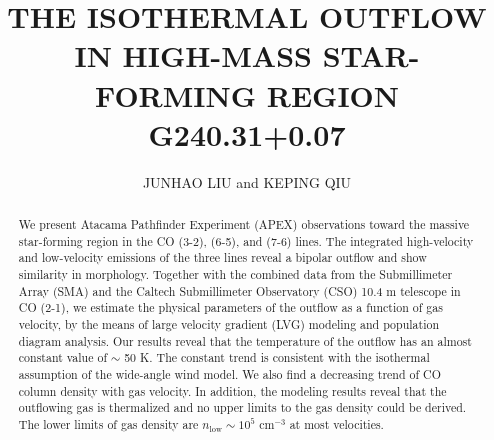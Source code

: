 \documentclass[preprint2]{aastex}
\begin{document}
\title{THE ISOTHERMAL OUTFLOW IN HIGH-MASS STAR-FORMING REGION G240.31+0.07}
\author{JUNHAO LIU and KEPING QIU} %

\begin{abstract}
We present Atacama Pathfinder Experiment (APEX) observations toward the massive star-forming region  in the CO (3-2), (6-5), and (7-6) lines. The integrated high-velocity and low-velocity emissions of the three lines reveal a bipolar outflow and show similarity in morphology. Together with the combined data from the Submillimeter Array (SMA) and the Caltech Submillimeter Observatory (CSO) 10.4 m telescope in CO (2-1), we estimate the physical parameters of the outflow as a function of gas velocity, by the means of large velocity gradient (LVG) modeling and population diagram analysis. Our results reveal that the temperature of the outflow has an almost constant value of $\sim$ 50 K. The constant trend is consistent with the isothermal assumption of the wide-angle wind model. We also find a decreasing trend of CO column density with gas velocity. In addition, the modeling results reveal that the outflowing gas is thermalized and no upper limits to the gas density could be derived. The lower limits of gas density are $n_{\mathrm{low}} \sim 10^5$ cm$^{-3}$ at most velocities.
\end{abstract}







\end{document}
